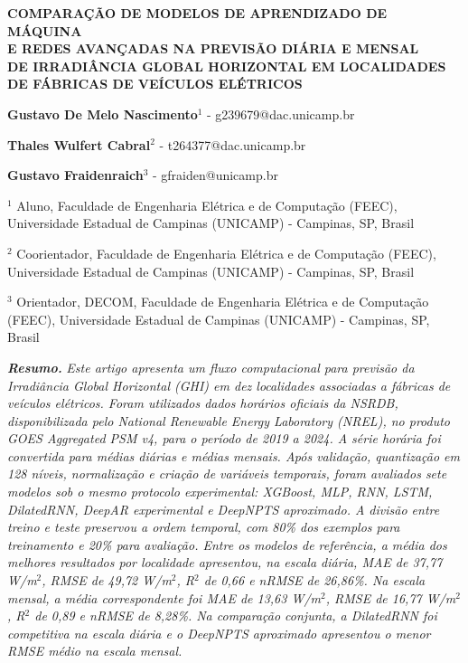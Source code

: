 \documentclass[12pt,a4paper]{article}
\newcommand{\linhaautor}[3]{\noindent\textbf{#1}$^{#2}$ - #3\par}
\newcommand{\linhaafiliacao}[2]{%
  \noindent\hangindent=0.38cm\hangafter=1
  $^{#1}$ #2\par
}
\begin{document}
\vspace*{2pt}

\begin{center}
\begin{minipage}{0.96\textwidth}
\centering
\fontsize{12.2}{13.6}\selectfont\bfseries
COMPARAÇÃO DE MODELOS DE APRENDIZADO DE MÁQUINA\\
E REDES AVANÇADAS NA PREVISÃO DIÁRIA E MENSAL\\
DE IRRADIÂNCIA GLOBAL HORIZONTAL EM LOCALIDADES\\
DE FÁBRICAS DE VEÍCULOS ELÉTRICOS%
\end{minipage}
\end{center}

\vspace{24pt}

\begingroup
\fontsize{11.6}{13.4}\selectfont
\linhaautor{Gustavo De Melo Nascimento}{1}{g239679@dac.unicamp.br}
\linhaautor{Thales Wulfert Cabral}{2}{t264377@dac.unicamp.br}
\linhaautor{Gustavo Fraidenraich}{3}{gfraiden@unicamp.br}

\vspace{9pt}

\linhaafiliacao{1}{Aluno, Faculdade de Engenharia Elétrica e de Computação (FEEC), Universidade Estadual de Campinas (UNICAMP) - Campinas, SP, Brasil}
\linhaafiliacao{2}{Coorientador, Faculdade de Engenharia Elétrica e de Computação (FEEC), Universidade Estadual de Campinas (UNICAMP) - Campinas, SP, Brasil}
\linhaafiliacao{3}{Orientador, DECOM, Faculdade de Engenharia Elétrica e de Computação (FEEC), Universidade Estadual de Campinas (UNICAMP) - Campinas, SP, Brasil}
\endgroup

\vspace{26pt}

\begingroup
\fontsize{11.6}{13.5}\selectfont
\noindent\textbf{\textit{Resumo.}} \textit{Este artigo apresenta um fluxo computacional para previsão da Irradiância Global Horizontal (GHI) em dez localidades associadas a fábricas de veículos elétricos. Foram utilizados dados horários oficiais da NSRDB, disponibilizada pelo National Renewable Energy Laboratory (NREL), no produto GOES Aggregated PSM v4, para o período de 2019 a 2024. A série horária foi convertida para médias diárias e médias mensais. Após validação, quantização em 128 níveis, normalização e criação de variáveis temporais, foram avaliados sete modelos sob o mesmo protocolo experimental: XGBoost, MLP, RNN, LSTM, DilatedRNN, DeepAR experimental e DeepNPTS aproximado. A divisão entre treino e teste preservou a ordem temporal, com 80\% dos exemplos para treinamento e 20\% para avaliação. Entre os modelos de referência, a média dos melhores resultados por localidade apresentou, na escala diária, MAE de 37,77 W/m$^2$, RMSE de 49,72 W/m$^2$, R$^2$ de 0,66 e nRMSE de 26,86\%. Na escala mensal, a média correspondente foi MAE de 13,63 W/m$^2$, RMSE de 16,77 W/m$^2$, R$^2$ de 0,89 e nRMSE de 8,28\%. Na comparação conjunta, a DilatedRNN foi competitiva na escala diária e o DeepNPTS aproximado apresentou o menor RMSE médio na escala mensal.}
\end{document}

